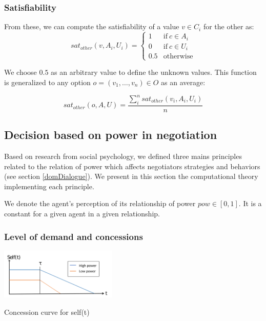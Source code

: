 \documentclass{llncs}
\begin{document}
		\subsubsection*{Satisfiability}
		 From these, we can compute the satisfiability of a value $v\in C_i$ for the other as:
		\vspace{-0.5em} 
		\begin{equation}
		sat_{other}(v, A_i, U_i)= \left\{\begin{array}{ll}
		1	 & \mathrm{if\ }  c \in A_i\\
		0    & \mathrm{if\ }c \in U_i\\
		0.5	 & \mathrm{otherwise}
		\end{array}\right.
		\end{equation}
		
		We choose $0.5$ as an arbitrary value to define the unknown values. This function is generalized to any option $o=(v_1,\ldots,v_n) \in O$ as an average:
		
		\begin{equation}
		sat_{other}(o, A, U) = \frac{ \sum_{i}^{n} sat_{other}(v_i, A_i, U_i) } {n}
		\end{equation}
		
		
		
		\subsection{Decision based on power in negotiation}
		\label{sec:decision}
		
		
		Based on research from social psychology, we defined three mains principles related to the relation of power which affects negotiators strategies and behaviors (see section \ref{domDialogue}). We present in this section the computational theory implementing each principle. 
		
		We denote the agent's perception of its relationship of power $pow \in [0, 1] $. It is a constant for a given agent in a given relationship.
		
		
		\subsubsection{Level of demand and concessions}
		
		
		\begin{floatingfigure}[r]{2.3in}
			\includegraphics[width=2.2in]{graphs/s3.png}
			\caption{\label{fig:conc}Concession curve for self(t)}
		\end{floatingfigure} 
		
\end{document}
